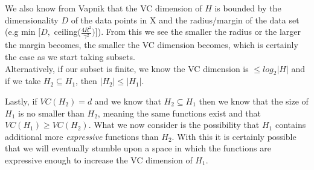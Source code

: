 \documentclass[11pt,a4paper]{article}
\begin{document}
\begin{itemize}
				We also know from Vapnik that the VC dimension of $H$ is bounded by the dimensionality $D$ of the data points in X and the radius/margin of the data set (e.g min $\Big[ D,$ ceiling($\frac{4R^2}{\gamma^2}) \Big]$). From this we see the smaller the radius or the larger the margin becomes, the smaller the VC dimension becomes, which is certainly the case as we start taking subsets.\\
				
				Alternatively, if our subset is finite, we know the VC dimension is $\leq log_2 \vert H \vert$ and if we take $H_2 \subseteq H_1$, then $\vert H_2 \vert \leq \vert H_1 \vert$.
				
				Lastly, if $VC(H_2) = d$ and we know that $H_2 \subseteq H_1$ then we know that the size of $H_1$ is no smaller than $H_2$, meaning the same functions exist and that $VC(H_1) \geq VC(H_2)$. What we now consider is the possibility that $H_1$ contains additional more \textit{expressive} functions than $H_2$. With this it is certainly possible that we will eventually stumble upon a space in which the functions are expressive enough to increase the VC dimension of $H_1$.
		\end{itemize}
	
\end{document}
